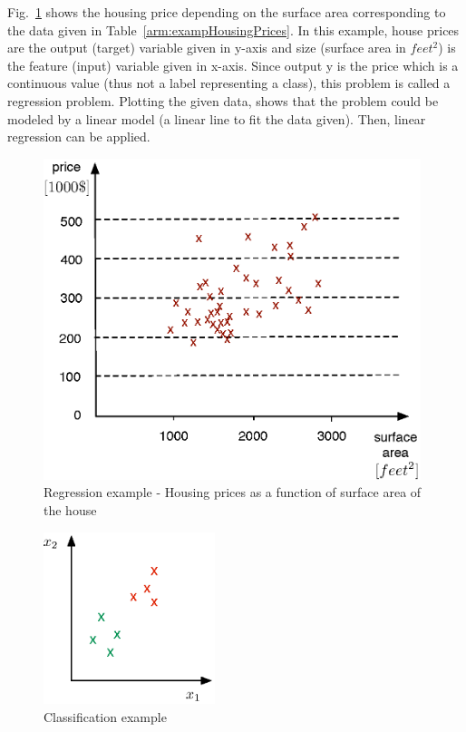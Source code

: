 Fig.~\ref{fig:housingPrices} shows the housing price depending on the surface area corresponding to the data given in Table~\ref{arm:exampHousingPrices}.
In this example, house prices are the output (target) variable given in y-axis and size (surface area in $feet^2$) is the feature (input) variable given in x-axis. 
Since output y is the price which is a continuous value (thus not a label representing a class), this problem is called a regression problem. Plotting the given data, shows that the problem could be modeled by a linear model (a linear line to fit the data given). Then, linear regression can be applied.

\begin{figure}
\begin{center}
\includegraphics[width=11cm]{figures/linearRegressionExamp}    %
\caption{Regression example - Housing prices as a function of surface area of the house \cite{andrewNg_MachLearning}} 
\label{fig:housingPrices}
\end{center}
\end{figure}

\begin{figure}
\begin{center}
\includegraphics[width=5cm]{figures/classificationEx2}    %
\caption{Classification example} 
\label{fig:classificationEx2}
\end{center}
\end{figure}

